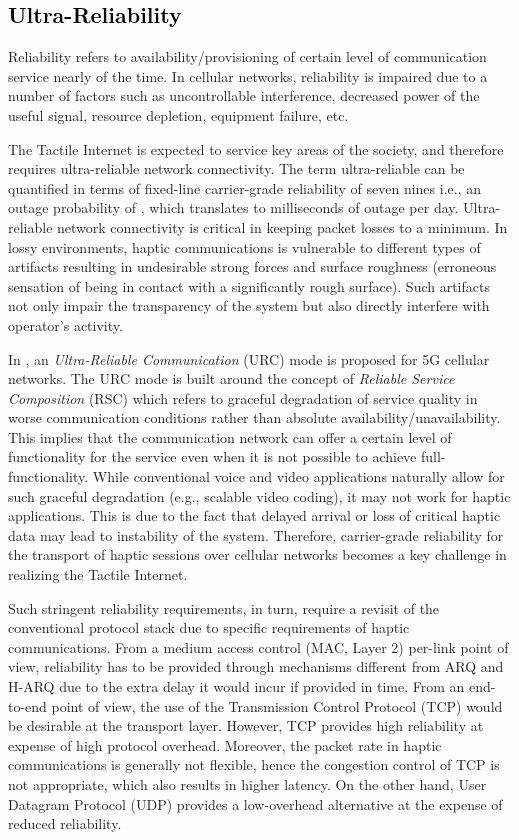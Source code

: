 \documentclass[journal]{IEEEtran}
\begin{document}
\subsection{\textcolor{black}{Ultra-Reliability}}
Reliability refers to availability/provisioning of certain level of communication service nearly  of the time. In cellular networks, reliability is impaired due to a number of factors \cite{URC} such as uncontrollable interference, decreased power of the useful signal, resource depletion, equipment failure, etc.

The Tactile Internet is expected to service key areas of the society, and therefore requires ultra-reliable network connectivity. The term ultra-reliable can be quantified in terms of fixed-line carrier-grade reliability of seven nines i.e., an outage probability of , which translates to milliseconds of outage per day. Ultra-reliable network connectivity is critical in keeping packet losses to a minimum. In lossy environments, haptic communications is vulnerable to different types of artifacts resulting in undesirable strong forces and surface roughness (erroneous sensation of being in contact with a significantly rough surface). Such artifacts not only impair the transparency of the system but also directly interfere with operator's activity.

In \cite{URC}, an \emph{Ultra-Reliable Communication} (URC) mode is proposed for 5G cellular networks. The URC mode is built around the concept of \emph{Reliable Service Composition} (RSC) which refers to graceful degradation of service quality in worse communication conditions rather than absolute availability/unavailability. This implies that the communication network can offer a certain level of functionality for the service even when it is not possible to achieve full-functionality. While conventional voice and video applications naturally allow for such graceful degradation (e.g., scalable video coding), it may not work for haptic applications. This is due to the fact that delayed arrival or loss of critical haptic data may lead to instability of the system. Therefore, carrier-grade reliability for the transport of haptic sessions over cellular networks becomes a key challenge in realizing the Tactile Internet.

Such stringent reliability requirements, in turn, require a revisit of the conventional protocol stack due to specific requirements of haptic communications. From a medium access control (MAC, Layer 2) per-link point of view, reliability has to be provided through mechanisms different from ARQ and H-ARQ due to the extra delay it would incur if provided in time. From an end-to-end point of view, the use of the Transmission Control Protocol (TCP) would be desirable at the transport layer.  However, TCP provides high reliability at expense of high protocol overhead. Moreover, the packet rate in haptic communications is generally not flexible, hence the congestion control of TCP is not appropriate, which also results in higher latency. On the other hand, User Datagram Protocol (UDP) provides a low-overhead alternative at the expense of reduced reliability.
\end{document}
